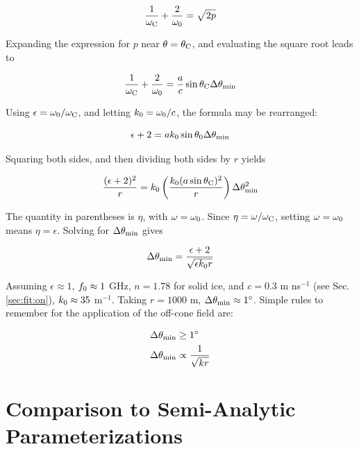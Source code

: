 \documentclass[amsmath,amssymb,aps,prd,10pt,twocolumn]{revtex4}
\begin{document}
\begin{equation}
\frac{1}{\omega_{\rm C}} + \frac{2}{\omega_{\rm 0}} = \sqrt{2p}
\end{equation}

Expanding the expression for $p$ near $\theta = \theta_{\rm C}$, and evaluating the square root leads to

\begin{equation}
\frac{1}{\omega_{\rm C}} + \frac{2}{\omega_{\rm 0}} = \frac{a}{c}\sin\theta_{\rm C} \Delta\theta_{\rm min}
\end{equation}

Using $\epsilon = \omega_{\rm 0}/\omega_{\rm C}$, and letting $k_{\rm 0} = \omega_{\rm 0}/c$, the formula may be rearranged:

\begin{equation}
\epsilon + 2 = a k_{\rm 0} \sin\theta_{\rm 0}\Delta\theta_{\rm min}
\end{equation}

Squaring both sides, and then dividing both sides by $r$ yields

\begin{equation}
\frac{(\epsilon+2)^2}{r} = k_{\rm 0} \left(\frac{k_{\rm 0} (a\sin\theta_{\rm C})^2}{r}\right)\Delta\theta^2_{\rm min}
\end{equation}

The quantity in parentheses is $\eta$, with $\omega = \omega_{\rm 0}$.  Since $\eta = \omega/\omega_{\rm C}$, setting $\omega = \omega_{\rm 0}$ means $\eta = \epsilon$.  Solving for $\Delta\theta_{\rm min}$ gives

\begin{equation}
\Delta\theta_{\rm min} = \frac{\epsilon+2}{\sqrt{\epsilon k_{\rm 0} r}}
\end{equation}

Assuming $\epsilon \approx 1$, $f_{\rm 0} \approx 1$ GHz, $n = 1.78$ for solid ice, and $c = 0.3$ m ns$^{-1}$ (see Sec. \ref{sec:fit:on}), $k_{\rm 0} \approx 35$ m$^{-1}$.  Taking $r = 1000$ m, $\Delta\theta_{\rm min} \approx 1^{\circ}$.  Simple rules to remember for the application of the off-cone field are:

\begin{align}
\Delta\theta_{\rm min} &\geq 1^{\circ} \\
\Delta\theta_{\rm min} &\propto \frac{1}{\sqrt{kr}}
\end{align}

\section{Comparison to Semi-Analytic Parameterizations}
\label{sec:fit}
\end{document}
